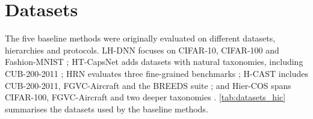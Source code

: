 \section{Datasets}
\label{sec:datasets}

The five baseline methods were originally evaluated on different datasets,
hierarchies and protocols. LH-DNN focuses on CIFAR-10, CIFAR-100 and
Fashion-MNIST \cite{fiaschi2024informed}; HT-CapsNet adds datasets with natural
taxonomies, including CUB-200-2011 \cite{noor2025taxonomy}; HRN evaluates three
fine-grained benchmarks \cite{chen2022label}; H-CAST includes CUB-200-2011,
FGVC-Aircraft and the BREEDS suite \cite{park2024visually}; and Hier-COS spans
CIFAR-100, FGVC-Aircraft and two deeper taxonomies \cite{sani2025hiercos}.
\cref{tab:datasets_hic} summarises the datasets used by the baseline methods.

